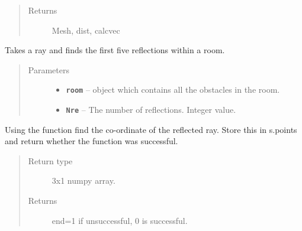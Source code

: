 \documentclass[letterpaper,10pt,english]{sphinxmanual}
\begin{document}
\begin{fulllineitems}
\begin{fulllineitems}
\begin{itemize}
\begin{itemize}
\end{itemize}

\end{itemize}
\begin{quote}\begin{description}
\item[{Returns}] \leavevmode
Mesh, dist, calcvec

\end{description}\end{quote}

\end{fulllineitems}


\begin{fulllineitems}
\label{index:Rays.Ray.multiref}
Takes a ray and finds the first five reflections within a room.
\begin{quote}\begin{description}
\item[{Parameters}] \leavevmode\begin{itemize}
\item {} 
\textbf{\texttt{room}} -- {\hyperref[index:Room.room]{}} object which     contains all the obstacles in the room.

\item {} 
\textbf{\texttt{Nre}} -- The number of reflections. Integer value.

\end{itemize}

\end{description}\end{quote}

Using the function  find the     co-ordinate of the reflected ray. Store this in s.points     and return whether the function was successful.
\begin{quote}\begin{description}
\item[{Return type}] \leavevmode
3x1 numpy array.

\item[{Returns}] \leavevmode
end=1 if unsuccessful, 0 is successful.

\end{description}\end{quote}

\end{fulllineitems}


\end{fulllineitems}
\end{document}

